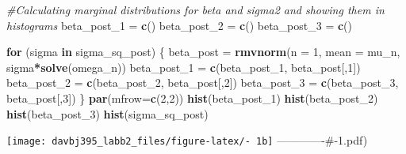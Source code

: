 \documentclass[]{article}
\newenvironment{Shaded}{\begin{snugshade}}{\end{snugshade}}
\newcommand{\CommentTok}[1]{\textcolor[rgb]{0.56,0.35,0.01}{\textit{#1}}}
\newcommand{\ControlFlowTok}[1]{\textcolor[rgb]{0.13,0.29,0.53}{\textbf{#1}}}
\newcommand{\DataTypeTok}[1]{\textcolor[rgb]{0.13,0.29,0.53}{#1}}
\newcommand{\DecValTok}[1]{\textcolor[rgb]{0.00,0.00,0.81}{#1}}
\newcommand{\KeywordTok}[1]{\textcolor[rgb]{0.13,0.29,0.53}{\textbf{#1}}}
\newcommand{\NormalTok}[1]{#1}
\newcommand{\OperatorTok}[1]{\textcolor[rgb]{0.81,0.36,0.00}{\textbf{#1}}}
\newcommand{\StringTok}[1]{\textcolor[rgb]{0.31,0.60,0.02}{#1}}
\begin{document}
\begin{Shaded}
\begin{Highlighting}[]
\CommentTok{#Calculating marginal distributions for beta and sigma2 and showing them in histograms}
\NormalTok{beta_post_}\DecValTok{1}\NormalTok{ =}\StringTok{ }\KeywordTok{c}\NormalTok{()}
\NormalTok{beta_post_}\DecValTok{2}\NormalTok{ =}\StringTok{ }\KeywordTok{c}\NormalTok{()}
\NormalTok{beta_post_}\DecValTok{3}\NormalTok{ =}\StringTok{ }\KeywordTok{c}\NormalTok{()}

\ControlFlowTok{for}\NormalTok{ (sigma }\ControlFlowTok{in}\NormalTok{ sigma_sq_post) \{}
\NormalTok{  beta_post =}\StringTok{ }\KeywordTok{rmvnorm}\NormalTok{(}\DataTypeTok{n =} \DecValTok{1}\NormalTok{, }\DataTypeTok{mean =}\NormalTok{ mu_n, sigma}\OperatorTok{*}\KeywordTok{solve}\NormalTok{(omega_n)) }
\NormalTok{  beta_post_}\DecValTok{1}\NormalTok{ =}\StringTok{ }\KeywordTok{c}\NormalTok{(beta_post_}\DecValTok{1}\NormalTok{, beta_post[,}\DecValTok{1}\NormalTok{])}
\NormalTok{  beta_post_}\DecValTok{2}\NormalTok{ =}\StringTok{ }\KeywordTok{c}\NormalTok{(beta_post_}\DecValTok{2}\NormalTok{, beta_post[,}\DecValTok{2}\NormalTok{])}
\NormalTok{  beta_post_}\DecValTok{3}\NormalTok{ =}\StringTok{ }\KeywordTok{c}\NormalTok{(beta_post_}\DecValTok{3}\NormalTok{, beta_post[,}\DecValTok{3}\NormalTok{])}
\NormalTok{\}}
\KeywordTok{par}\NormalTok{(}\DataTypeTok{mfrow=}\KeywordTok{c}\NormalTok{(}\DecValTok{2}\NormalTok{,}\DecValTok{2}\NormalTok{))}
\KeywordTok{hist}\NormalTok{(beta_post_}\DecValTok{1}\NormalTok{)}
\KeywordTok{hist}\NormalTok{(beta_post_}\DecValTok{2}\NormalTok{)}
\KeywordTok{hist}\NormalTok{(beta_post_}\DecValTok{3}\NormalTok{)}
\KeywordTok{hist}\NormalTok{(sigma_sq_post)}
\end{Highlighting}
\end{Shaded}

\texttt{[image: davbj395\_labb2\_files/figure-latex/- 1b]}
-------------\#-1.pdf)
\end{document}
